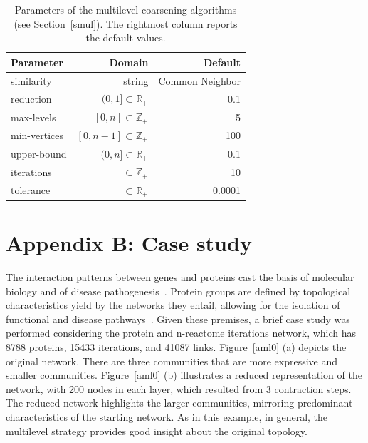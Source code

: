 \documentclass[runningheads]{llncs}
\begin{document}
\begin{table}[!ht]
    \centering
	\caption{Parameters of the multilevel coarsening algorithms (see Section~\ref{smul}). The rightmost column reports the default values. }
	\label{tab:parameters}
 	\renewcommand{\arraystretch}{1.3}
 	\renewcommand{\tabcolsep}{0.45cm}
    \begin{tabular}{lrr}
    	\textbf{Parameter} & \textbf{Domain} & \textbf{Default} \\
    	\hline
    	similarity & string & Common Neighbor \\
        reduction & $(0,1] \subset \mathbb{R}_+$ & 0.1 \\
        max-levels & $[0,n] \subset \mathbb{Z}_+$ & 5 \\
        min-vertices & $[0,n-1] \subset \mathbb{Z}_+$ & 100 \\
        upper-bound & $(0,n] \subset \mathbb{R}_+$ & 0.1 \\
        iterations & $\subset \mathbb{Z}_+$ & 10 \\
        tolerance & $\subset \mathbb{R}_+$ & 0.0001 \\
    \end{tabular}
\end{table}

\null
\vfill

\section*{Appendix B: Case study}
The interaction patterns between genes and proteins cast the basis of molecular biology and of disease pathogenesis~\cite{netD,mlCa}.
Protein groups are defined by topological characteristics yield by the networks they entail,
allowing for the isolation of functional and disease pathways~\cite{bara,shara}.
Given these premises,
a brief case study was performed considering the protein and
n-reactome iterations network,
which has 8788 proteins, 15433 iterations, and 41087 links.
Figure~\ref{aml0} (a) depicts the original network.
There are three communities that are more expressive and smaller communities.
Figure~\ref{aml0} (b) illustrates a reduced representation of the network,
with 200 nodes in each layer,
which resulted from 3 contraction steps.
The reduced network highlights the larger communities,
mirroring predominant characteristics of the starting network.
As in this example, in general,
the multilevel strategy provides good insight about the original topology.
\end{document}
